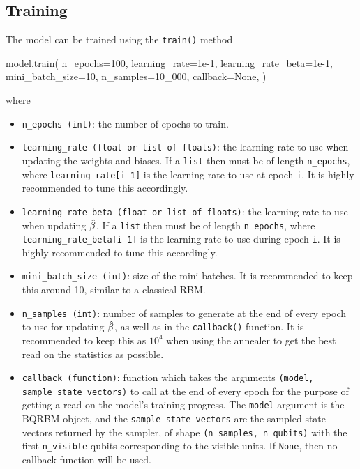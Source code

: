 \subsection{Training}
The model can be trained using the \texttt{train()} method
\begin{python}
model.train(
    n_epochs=100,
    learning_rate=1e-1,
    learning_rate_beta=1e-1,
    mini_batch_size=10,
    n_samples=10_000,
    callback=None,
)
\end{python}
where
\begin{itemize}
    \item \texttt{n\_epochs (int)}: the number of epochs to train.
    \item \texttt{learning\_rate (float or list of floats)}: the learning rate to use when updating the weights and biases. If a \texttt{list} then must be of length \texttt{n\_epochs}, where \texttt{learning\_rate[i-1]} is the learning rate to use at epoch \texttt{i}. It is highly recommended to tune this accordingly.
    \item \texttt{learning\_rate\_beta (float or list of floats)}: the learning rate to use when updating \( \hat{\beta} \). If a \texttt{list} then must be of length \texttt{n\_epochs}, where \newline\texttt{learning\_rate\_beta[i-1]} is the learning rate to use during epoch \texttt{i}. It is highly recommended to tune this accordingly.
    \item \texttt{mini\_batch\_size (int)}: size of the mini-batches. It is recommended to keep this around 10, similar to a classical RBM.
    \item \texttt{n\_samples (int)}: number of samples to generate at the end of every epoch to use for updating \( \hat{\beta} \), as well as in the \texttt{callback()} function. It is recommended to keep this as \( 10^4 \) when using the annealer to get the best read on the statistics as possible.
    \item \texttt{callback (function)}: function which takes the arguments \texttt{(model, sample\_state\_vectors)} to call at the end of every epoch for the purpose of getting a read on the model's training progress. The \texttt{model} argument is the BQRBM object, and the \texttt{sample\_state\_vectors} are the sampled state vectors returned by the sampler, of shape \texttt{(n\_samples, n\_qubits)} with the first \texttt{n\_visible} qubits corresponding to the visible units. If \texttt{None}, then no callback function will be used.
\end{itemize}

